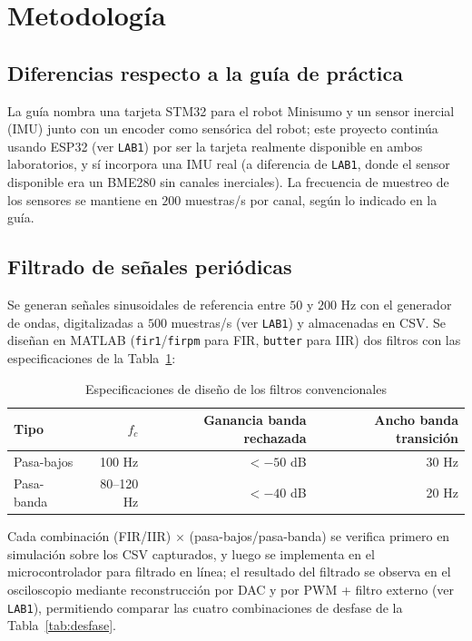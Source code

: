 
\section{Metodología}

\subsection{Diferencias respecto a la guía de práctica}

La guía nombra una tarjeta STM32 para el robot Minisumo y un sensor inercial (IMU) junto con un encoder como sensórica del robot; este proyecto continúa usando ESP32 (ver \texttt{LAB1}) por ser la tarjeta realmente disponible en ambos laboratorios, y sí incorpora una IMU real (a diferencia de \texttt{LAB1}, donde el sensor disponible era un BME280 sin canales inerciales). La frecuencia de muestreo de los sensores se mantiene en $200$ muestras/s por canal, según lo indicado en la guía.

\subsection{Filtrado de señales periódicas}

Se generan señales sinusoidales de referencia entre $50$ y $200$ Hz con el generador de ondas, digitalizadas a $500$ muestras/s (ver \texttt{LAB1}) y almacenadas en CSV. Se diseñan en MATLAB (\texttt{fir1}/\texttt{firpm} para FIR, \texttt{butter} para IIR) dos filtros con las especificaciones de la Tabla~\ref{tab:specs-filtros}:

\begin{table}[!t]
\centering
\caption{Especificaciones de diseño de los filtros convencionales}
\label{tab:specs-filtros}
\small
\begin{tabular}{@{}l r r r@{}}
\toprule
Tipo & $f_c$ & Ganancia banda rechazada & Ancho banda transición \\
\midrule
Pasa-bajos & 100 Hz & $< -50$ dB & 30 Hz \\
Pasa-banda & 80--120 Hz & $< -40$ dB & 20 Hz \\
\bottomrule
\end{tabular}
\end{table}

Cada combinación (FIR/IIR) $\times$ (pasa-bajos/pasa-banda) se verifica primero en simulación sobre los CSV capturados, y luego se implementa en el microcontrolador para filtrado en línea; el resultado del filtrado se observa en el osciloscopio mediante reconstrucción por DAC y por PWM + filtro externo (ver \texttt{LAB1}), permitiendo comparar las cuatro combinaciones de desfase de la Tabla~\ref{tab:desfase}.

